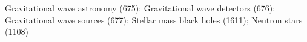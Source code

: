 Gravitational wave astronomy (675); Gravitational wave detectors (676); Gravitational wave sources (677); Stellar mass black holes (1611); Neutron stars (1108)
